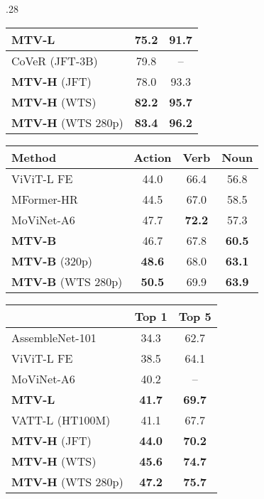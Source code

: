 \begin{table*}[t]
\begin{subtable}[t]{.28\linewidth}
{\begin{tabular}{lcc}
  				\textbf{MTV-L} & \textbf{75.2} & \textbf{91.7} \\  \midrule
	  			CoVeR (JFT-3B)~\cite{zhang2021co} & 79.8 & -- \\
  				\textbf{MTV-H} (JFT) & 78.0 & 93.3 \\  \textbf{MTV-H} (WTS) & \textbf{82.2} & \textbf{95.7} \\  \textbf{MTV-H} (WTS 280p) & \textbf{83.4} & \textbf{96.2} \\  \bottomrule
  			\end{tabular}
  			\label{tab:sota_kinetics700}
  		}
  		\vspace{0.18\baselineskip} \centering
  		\caption{Epic-Kitchens-100 Top 1 accuracy}
  		\vspace{-0.2\baselineskip}
  		\setlength{\tabcolsep}{4pt} \scriptsize{
			\begin{tabular}{lccc}
				\toprule
				Method 													 & Action & Verb  & Noun  \\
				\midrule
ViViT-L FE~\cite{arnab2021vivit} & 44.0 & 66.4 & 56.8 \\ MFormer-HR~\cite{patrick2021keeping} & 44.5 & 67.0 & 58.5  \\
				MoViNet-A6~\cite{kondratyuk2021movinets} & 47.7 & \textbf{72.2} & 57.3 \\ \textbf{MTV-B} & 46.7 & 67.8 & \textbf{60.5} \\ \textbf{MTV-B} (320p) & \textbf{48.6} & 68.0 & \textbf{63.1} \\ \midrule
			    \textbf{MTV-B} (WTS 280p) & \textbf{50.5} & 69.9 & \textbf{63.9} \\ \bottomrule
			\end{tabular}
		}
		\label{tab:sota_epic_kitchens}
\centering
  		\caption{Moments in Time}
  		\vspace{-0.1\baselineskip}
  		\setlength{\tabcolsep}{6pt} \scriptsize{
  			\begin{tabular}{lcc}
  				\toprule
  				& Top 1 & Top 5 \\ 
  				\midrule
  				AssembleNet-101~\cite{ryoo2019assemblenet} 	&  34.3     &  62.7     \\
  				ViViT-L FE~\cite{arnab2021vivit} 	& 38.5 & 64.1 \\  MoViNet-A6~\cite{kondratyuk2021movinets} 	&  40.2     &  --     \\
  				\textbf{MTV-L}	& \textbf{41.7} & \textbf{69.7} \\  \midrule
  				VATT-L (HT100M)~\cite{akbari2021vatt}	&  41.1     &  67.7     \\
  				\textbf{MTV-H} (JFT)	& \textbf{44.0} & \textbf{70.2} \\  \textbf{MTV-H} (WTS)	& \textbf{45.6} & \textbf{74.7} \\  \textbf{MTV-H} (WTS 280p)	&
  				\textbf{47.2} & \textbf{75.7} \\  \bottomrule
  			\end{tabular}
  			\label{tab:sota_moments_in_time}
  		}

	\end{subtable}
	\label{tab:sota}
	\vspace{-\baselineskip}
\end{table*}

